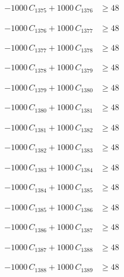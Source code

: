 \documentclass[a4paper,11pt]{article}
\begin{document}
\begin{align}
-1000\,C_{1375} + 1000\,C_{1376} &\geq 48 \nonumber
\end{align}

\begin{align}
-1000\,C_{1376} + 1000\,C_{1377} &\geq 48 \nonumber
\end{align}

\begin{align}
-1000\,C_{1377} + 1000\,C_{1378} &\geq 48 \nonumber
\end{align}

\begin{align}
-1000\,C_{1378} + 1000\,C_{1379} &\geq 48 \nonumber
\end{align}

\begin{align}
-1000\,C_{1379} + 1000\,C_{1380} &\geq 48 \nonumber
\end{align}

\begin{align}
-1000\,C_{1380} + 1000\,C_{1381} &\geq 48 \nonumber
\end{align}

\begin{align}
-1000\,C_{1381} + 1000\,C_{1382} &\geq 48 \nonumber
\end{align}

\begin{align}
-1000\,C_{1382} + 1000\,C_{1383} &\geq 48 \nonumber
\end{align}

\begin{align}
-1000\,C_{1383} + 1000\,C_{1384} &\geq 48 \nonumber
\end{align}

\begin{align}
-1000\,C_{1384} + 1000\,C_{1385} &\geq 48 \nonumber
\end{align}

\begin{align}
-1000\,C_{1385} + 1000\,C_{1386} &\geq 48 \nonumber
\end{align}

\begin{align}
-1000\,C_{1386} + 1000\,C_{1387} &\geq 48 \nonumber
\end{align}

\begin{align}
-1000\,C_{1387} + 1000\,C_{1388} &\geq 48 \nonumber
\end{align}

\begin{align}
-1000\,C_{1388} + 1000\,C_{1389} &\geq 48 \nonumber
\end{align}
\end{document}
